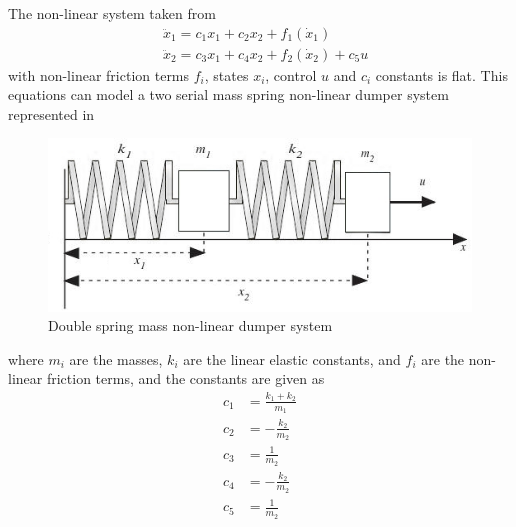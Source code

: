 \documentclass[12pt]{article}
\begin{document}
\begin{example} \label{expTwoMassParallel} \label{exp:controllingNonLinearSystem}
  The non-linear system taken from \cite[p.133]{Le09}
  \begin{equation}\begin{aligned} \label{eq2}
    &\ddot{x}_1 = c_1 x_1 + c_2 x_2 + f_1(\dot{x}_1) \\
    &\ddot{x}_2 = c_3 x_1 + c_4 x_2 + f_2(\dot{x}_2) + c_5u
  \end{aligned}\end{equation}
  with non-linear friction terms $f_i$, states $x_i$, control $u$ and $c_i$ constants is flat.
  This equations can model a two serial mass spring non-linear dumper system represented in 
  \begin{figure}[h]
    \centering  
    \includegraphics{double_spring_mass_dumper_levine_p133_bw_simplified}
    \caption{Double spring mass non-linear dumper system}
    \label{figDoubleMassSpringSystem}
  \end{figure}  
  where $m_i$ are the masses, $k_i$ are the linear elastic constants, and $f_i$ are the non-linear friction terms, and the constants are given as
  \begin{equation}\begin{aligned}
    c_1 &= \frac{k_1 + k_2}{m_1} \\
    c_2 &= - \frac{k_2}{m_2} \\
    c_3 &= \frac{1}{m_2} \\
    c_4 &= -\frac{k_2}{m_2} \\
    c_5 &= \frac{1}{m_2}
  \end{aligned}\end{equation}
\end{example}
\end{document}
